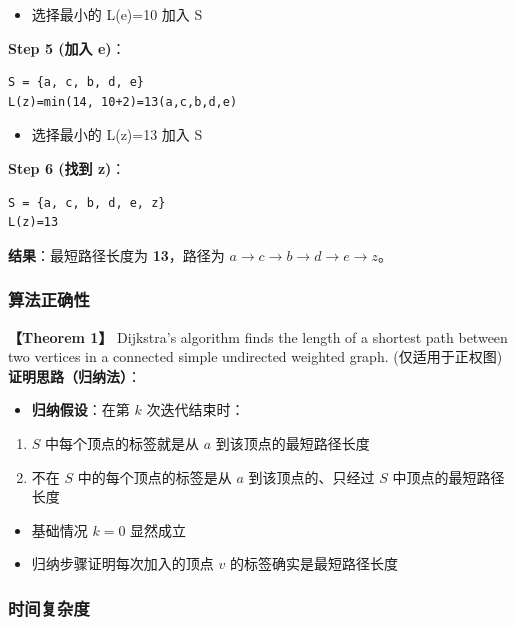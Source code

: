 \documentclass[10pt,a4paper,openany]{ctexbook}
\theoremstyle{definition}
\theoremstyle{remark}
\begin{document}
\begin{itemize}
\item 选择最小的 L(e)=10 加入 S

\end{itemize}

\textbf{Step 5 (加入 e)}：
{\footnotesize\begin{verbatim}
S = {a, c, b, d, e}
L(z)=min(14, 10+2)=13(a,c,b,d,e)
\end{verbatim}}

\begin{itemize}
\item 选择最小的 L(z)=13 加入 S

\end{itemize}

\textbf{Step 6 (找到 z)}：
{\footnotesize\begin{verbatim}
S = {a, c, b, d, e, z}
L(z)=13
\end{verbatim}}

\textbf{结果}：最短路径长度为 \textbf{13}，路径为 $a \to c \to b \to d \to e \to z$。
\vspace{-2pt}

\subsubsection{算法正确性}

\textbf{【Theorem 1】} Dijkstra's algorithm finds the length of a shortest path between two vertices in a connected simple undirected weighted graph. (仅适用于正权图)
\textbf{证明思路（归纳法）}：
\begin{itemize}
\item \textbf{归纳假设}：在第 $k$ 次迭代结束时：
\end{itemize}

\begin{enumerate}
\item $S$ 中每个顶点的标签就是从 $a$ 到该顶点的最短路径长度
\item 不在 $S$ 中的每个顶点的标签是从 $a$ 到该顶点的、只经过 $S$ 中顶点的最短路径长度
\end{enumerate}

\begin{itemize}
\item 基础情况 $k=0$ 显然成立
\item 归纳步骤证明每次加入的顶点 $v$ 的标签确实是最短路径长度

\end{itemize}

\subsubsection{时间复杂度}
\end{document}
